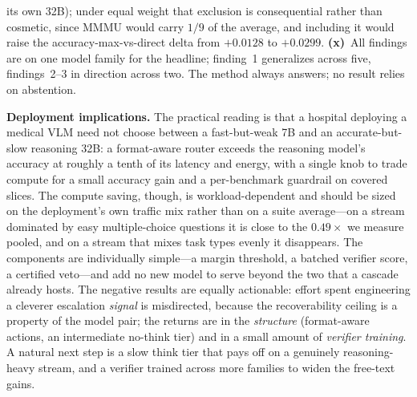 \documentclass[conference]{IEEEtran}
\begin{document}
its own 32B); under equal weight that exclusion is consequential rather than cosmetic, since MMMU would carry $1/9$ of the average, and including it would raise the accuracy-max-vs-direct delta from $+0.0128$ to $+0.0299$. \textbf{(x)}~All findings are on one model family for the headline; finding~1 generalizes across five, findings~2--3 in direction across two. The method always answers; no result relies on abstention.

\textbf{Deployment implications.} The practical reading is that a hospital deploying a medical VLM need not choose between a fast-but-weak 7B and an accurate-but-slow reasoning 32B: a format-aware router exceeds the reasoning model's accuracy at roughly a tenth of its latency and energy, with a single knob to trade compute for a small accuracy gain and a per-benchmark guardrail on covered slices. The compute saving, though, is workload-dependent and should be sized on the deployment's own traffic mix rather than on a suite average---on a stream dominated by easy multiple-choice questions it is close to the $0.49{\times}$ we measure pooled, and on a stream that mixes task types evenly it disappears. The components are individually simple---a margin threshold, a batched verifier score, a certified veto---and add no new model to serve beyond the two that a cascade already hosts. The negative results are equally actionable: effort spent engineering a cleverer escalation \emph{signal} is misdirected, because the recoverability ceiling is a property of the model pair; the returns are in the \emph{structure} (format-aware actions, an intermediate no-think tier) and in a small amount of \emph{verifier training}. A natural next step is a slow think tier that pays off on a genuinely reasoning-heavy stream, and a verifier trained across more families to widen the free-text gains.
\end{document}
